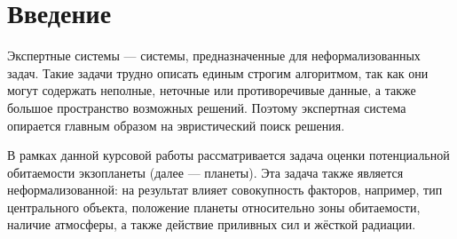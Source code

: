 \documentclass[14pt,a4paper]{extarticle}
\begin{document}
	\sloppy
	\thispagestyle{empty}

\newpage
\justifying
\tableofcontents
	
\newpage
\section*{Введение}

Экспертные системы --- системы, предназначенные для неформализованных задач. Такие задачи трудно описать единым строгим алгоритмом, так как они могут содержать неполные, неточные или противоречивые данные, а также большое пространство возможных решений. Поэтому экспертная система опирается главным образом на эвристический поиск решения.

В рамках данной курсовой работы рассматривается задача оценки потенциальной обитаемости экзопланеты (далее --- планеты). Эта задача также является неформализованной: на результат влияет совокупность факторов, например, тип центрального объекта, положение планеты относительно зоны обитаемости, наличие атмосферы, а также действие приливных сил и жёсткой радиации.
\end{document}
